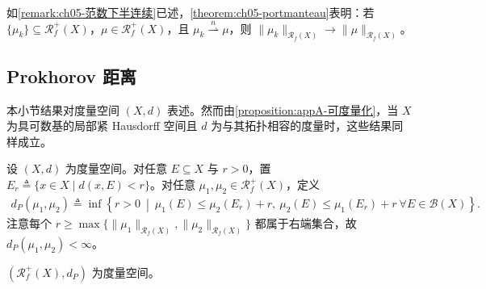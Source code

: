 \documentclass[../../main.tex]{subfiles}%
\begin{document}
\begin{remark}\label{remark:ch05-窄收敛范数}
如\cref{remark:ch05-范数下半连续}已述，\cref{theorem:ch05-portmanteau}表明：若 $\{\mu_k\}\subseteq\mathscr{R}^+_f(X)$，$\mu\in\mathscr{R}^+_f(X)$，且 $\mu_k\stackrel{n}{\rightharpoonup}\mu$，则 $\|\mu_k\|_{\mathscr{R}_f(X)}\to\|\mu\|_{\mathscr{R}_f(X)}$。
\end{remark}

\subsection{Prokhorov 距离}

本小节结果对度量空间 $(X,d)$ 表述。然而由\cref{proposition:appA-可度量化}，当 $X$ 为具可数基的局部紧 Hausdorff 空间且 $d$ 为与其拓扑相容的度量时，这些结果同样成立。

设 $(X,d)$ 为度量空间。对任意 $E\subseteq X$ 与 $r>0$，置 $E_r\triangleq \{x\in X\mid d(x,E)<r\}$。对任意 $\mu_1,\mu_2\in\mathscr{R}^+_f(X)$，定义
\begin{align}
d_P(\mu_1,\mu_2)\triangleq \inf\left\{r>0\ \middle|\
\mu_1(E)\leqslant\mu_2(E_r)+r,\ \mu_2(E)\leqslant\mu_1(E_r)+r
\ \forall E\in\mathscr{B}(X)\right\}.\label{align:ch05-5.11}
\end{align}
注意每个 $r\geqslant\max\{\|\mu_1\|_{\mathscr{R}_f(X)},\|\mu_2\|_{\mathscr{R}_f(X)}\}$ 都属于右端集合，故 $d_P(\mu_1,\mu_2)<\infty$。

\begin{proposition}\label{proposition:ch05-Prokhorov度量}
$(\mathscr{R}^+_f(X),d_P)$ 为度量空间。
\end{proposition}
\end{document}
